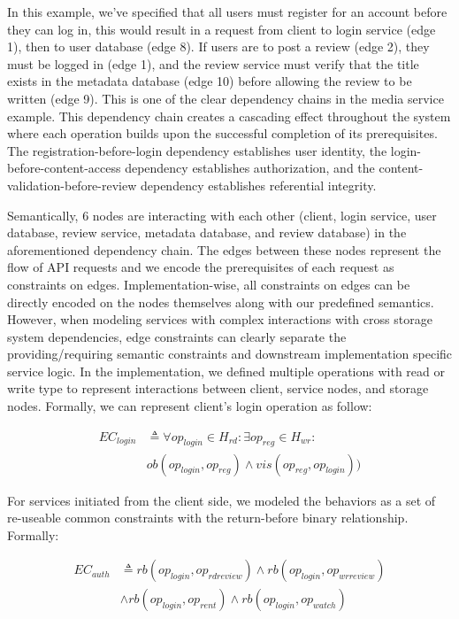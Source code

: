 {\color{red}
  In this example, we've specified that all users must register for
  an account before they can log in, this would result in a request from
  client to login service (edge 1), then to user database (edge 8).
  If users are to post a review (edge 2), they must
  be logged in (edge 1), and the review service must verify that the
  title exists
  in the metadata database (edge 10) before allowing the review to be
  written (edge 9).
  This is one of the clear dependency chains in the media service example.
  This dependency chain creates a cascading effect throughout the system
  where each operation builds upon the successful completion of its
  prerequisites.
  The registration-before-login dependency establishes user identity,
  the login-before-content-access dependency establishes authorization,
  and the content-validation-before-review dependency establishes
  referential integrity.

  Semantically, 6 nodes are interacting with each other (client,
    login service, user database, review service, metadata database,
  and review database) in the aforementioned dependency chain.
  The edges between these nodes represent the flow of API requests and we
  encode the prerequisites of each request as constraints on edges.
  Implementation-wise, all constraints on edges can be
  directly encoded on the nodes themselves along with our
  predefined semantics. However, when modeling
  services with complex interactions with cross storage system
  dependencies, edge constraints can clearly
  separate the providing/requiring semantic constraints and
  downstream implementation specific
  service logic. In the implementation, we defined multiple operations
  with read or write type to represent interactions between client,
  service nodes, and storage nodes.
  Formally, we can represent client's login operation as follow:

  \begin{align*}
    EC_{login} &\triangleq \forall op_{login} \in H_{rd} : \exists
    op_{reg} \in H_{wr} :\\
  &ob(op_{login}, op_{reg}) \land vis(op_{reg}, op_{login}))
\end{align*}

For services initiated from the client side, we modeled the behaviors
as a set of re-useable common constraints with the return-before
binary relationship. Formally:

\begin{align*}
  EC_{auth} &\triangleq rb(op_{login}, op_{rdreview}) \land
  rb(op_{login}, op_{wrreview}) \\
  &\land rb(op_{login}, op_{rent}) \land rb(op_{login}, op_{watch})
\end{align*}

}
